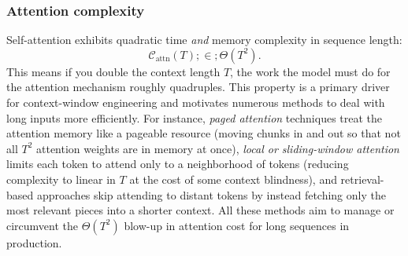 \subsubsection{Attention complexity}
Self-attention exhibits quadratic time \emph{and} memory complexity in sequence length:
\begin{equation}
\label{eq:attn-complexity}
\mathcal{C}_{\text{attn}}(T) ;\in; \Theta(T^2).
\end{equation}
This means if you double the context length $T$, the work the model must do for the attention mechanism roughly quadruples. This property is a primary driver for context-window engineering and motivates numerous methods to deal with long inputs more efficiently. For instance, \textit{paged attention} techniques treat the attention memory like a pageable resource (moving chunks in and out so that not all $T^2$ attention weights are in memory at once), \textit{local or sliding-window attention} limits each token to attend only to a neighborhood of tokens (reducing complexity to linear in $T$ at the cost of some context blindness), and retrieval-based approaches skip attending to distant tokens by instead fetching only the most relevant pieces into a shorter context. All these methods aim to manage or circumvent the $\Theta(T^2)$ blow-up in attention cost for long sequences in production.

